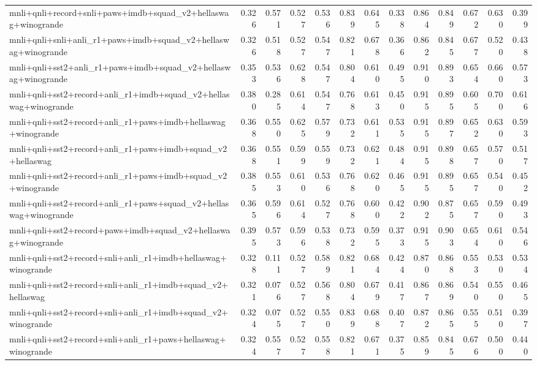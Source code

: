 \begin{table}[t]
\begin{tabular}{lrrrrrrrrrrrr}
    mnli+qnli+record+snli+paws+imdb+squad\_v2+hellaswag+winogrande & 0.326 & 0.571 & 0.527 & 0.536 & 0.839 & 0.645 & 0.338 & 0.864 & 0.849 & 0.672 & 0.630 & 0.399 \\
    mnli+qnli+snli+anli\_r1+paws+imdb+squad\_v2+hellaswag+winogrande & 0.326 & 0.518 & 0.527 & 0.547 & 0.821 & 0.678 & 0.366 & 0.862 & 0.845 & 0.677 & 0.520 & 0.438 \\
    mnli+qnli+sst2+anli\_r1+paws+imdb+squad\_v2+hellaswag+winogrande & 0.353 & 0.536 & 0.628 & 0.547 & 0.804 & 0.610 & 0.495 & 0.910 & 0.893 & 0.654 & 0.660 & 0.573 \\
    mnli+qnli+sst2+record+anli\_r1+imdb+squad\_v2+hellaswag+winogrande & 0.380 & 0.285 & 0.614 & 0.547 & 0.768 & 0.613 & 0.450 & 0.915 & 0.895 & 0.605 & 0.700 & 0.616 \\
    mnli+qnli+sst2+record+anli\_r1+paws+imdb+hellaswag+winogrande & 0.368 & 0.550 & 0.625 & 0.579 & 0.732 & 0.611 & 0.535 & 0.915 & 0.897 & 0.652 & 0.630 & 0.593 \\
    mnli+qnli+sst2+record+anli\_r1+paws+imdb+squad\_v2+hellaswag & 0.368 & 0.551 & 0.599 & 0.559 & 0.732 & 0.621 & 0.484 & 0.915 & 0.898 & 0.657 & 0.570 & 0.517 \\
    mnli+qnli+sst2+record+anli\_r1+paws+imdb+squad\_v2+winogrande & 0.385 & 0.553 & 0.610 & 0.536 & 0.768 & 0.620 & 0.465 & 0.915 & 0.895 & 0.657 & 0.540 & 0.452 \\
    mnli+qnli+sst2+record+anli\_r1+paws+squad\_v2+hellaswag+winogrande & 0.365 & 0.596 & 0.614 & 0.527 & 0.768 & 0.600 & 0.422 & 0.902 & 0.875 & 0.657 & 0.590 & 0.493 \\
    mnli+qnli+sst2+record+paws+imdb+squad\_v2+hellaswag+winogrande & 0.395 & 0.573 & 0.596 & 0.538 & 0.732 & 0.595 & 0.373 & 0.915 & 0.903 & 0.654 & 0.610 & 0.546 \\
    mnli+qnli+sst2+record+snli+anli\_r1+imdb+hellaswag+winogrande & 0.328 & 0.111 & 0.527 & 0.589 & 0.821 & 0.684 & 0.424 & 0.870 & 0.868 & 0.553 & 0.530 & 0.534 \\
    mnli+qnli+sst2+record+snli+anli\_r1+imdb+squad\_v2+hellaswag & 0.321 & 0.076 & 0.527 & 0.568 & 0.804 & 0.679 & 0.417 & 0.867 & 0.869 & 0.540 & 0.550 & 0.465 \\
    mnli+qnli+sst2+record+snli+anli\_r1+imdb+squad\_v2+winogrande & 0.324 & 0.075 & 0.527 & 0.550 & 0.839 & 0.688 & 0.407 & 0.872 & 0.865 & 0.555 & 0.510 & 0.397 \\
    mnli+qnli+sst2+record+snli+anli\_r1+paws+hellaswag+winogrande & 0.324 & 0.557 & 0.527 & 0.558 & 0.821 & 0.671 & 0.375 & 0.859 & 0.845 & 0.676 & 0.500 & 0.440 \\

\end{tabular}
\end{table}

